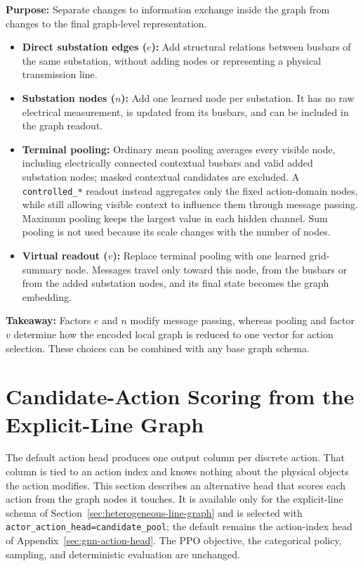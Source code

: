 \begin{tcolorbox}[
  colframe=red!75!black,
  colback=red!5!white,
  title=Chapter Summary (2/3): Augmentations and Graph Readout
]
\textbf{Purpose:} Separate changes to information exchange inside the graph
from changes to the final graph-level representation.

\begin{itemize}
  \item \textbf{Direct substation edges ($e$):} Add structural relations between
  busbars of the same substation, without adding nodes or representing a
  physical transmission line.
  \item \textbf{Substation nodes ($n$):} Add one learned node per substation.
  It has no raw electrical measurement, is updated from its busbars, and can be
  included in the graph readout.
  \item \textbf{Terminal pooling:} Ordinary mean pooling averages every visible
  node, including electrically connected contextual busbars and valid added
  substation nodes; masked contextual candidates are excluded. A
  \texttt{controlled\_*} readout instead aggregates only the fixed action-domain
  nodes, while still allowing visible context to influence them through message
  passing. Maximum pooling keeps the largest value in each hidden channel. Sum
  pooling is not used because its scale changes with the number of nodes.
  \item \textbf{Virtual readout ($v$):} Replace terminal pooling with one learned
  grid-summary node. Messages travel only toward this node, from the busbars or
  from the added substation nodes, and its final state becomes the graph
  embedding.
\end{itemize}

\textbf{Takeaway:} Factors $e$ and $n$ modify message passing, whereas pooling
and factor $v$ determine how the encoded local graph is reduced to one vector
for action selection. These choices can be combined with any base graph schema.
\end{tcolorbox}

\section{Candidate-Action Scoring from the Explicit-Line Graph}
\label{sec:candidate-action-scoring}

The default action head produces one output column per discrete action. That
column is tied to an action index and knows nothing about the physical objects
the action modifies. This section describes an alternative head that scores each
action from the graph nodes it touches. It is available only for the
explicit-line schema of Section~\ref{sec:heterogeneous-line-graph} and is
selected with \texttt{actor\_action\_head=candidate\_pool}; the default remains
the action-index head of Appendix~\ref{sec:gnn-action-head}. The PPO objective,
the categorical policy, sampling, and deterministic evaluation are unchanged.

